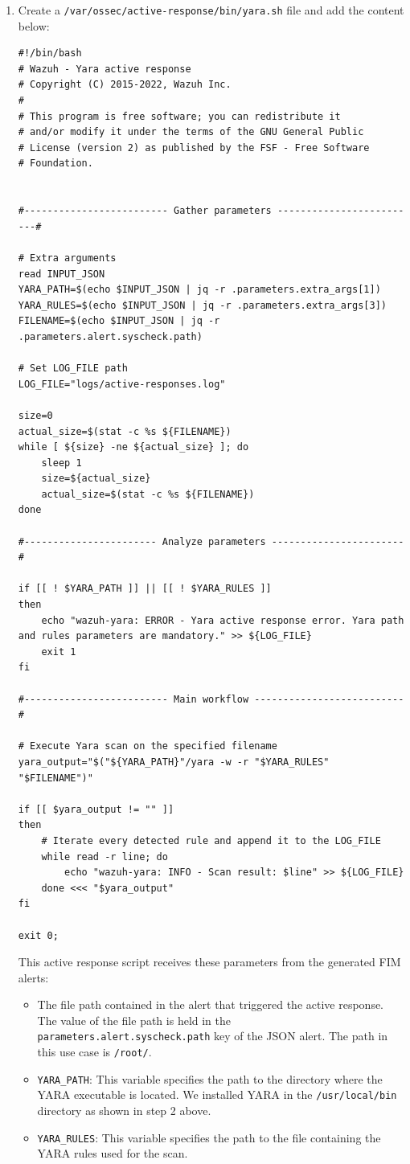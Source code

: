 \begin{enumerate}
    \item Create a \texttt{/var/ossec/active-response/bin/yara.sh} file and add the content below:
    \begin{verbatim}
#!/bin/bash
# Wazuh - Yara active response
# Copyright (C) 2015-2022, Wazuh Inc.
#
# This program is free software; you can redistribute it
# and/or modify it under the terms of the GNU General Public
# License (version 2) as published by the FSF - Free Software
# Foundation.


#------------------------- Gather parameters -------------------------#

# Extra arguments
read INPUT_JSON
YARA_PATH=$(echo $INPUT_JSON | jq -r .parameters.extra_args[1])
YARA_RULES=$(echo $INPUT_JSON | jq -r .parameters.extra_args[3])
FILENAME=$(echo $INPUT_JSON | jq -r .parameters.alert.syscheck.path)

# Set LOG_FILE path
LOG_FILE="logs/active-responses.log"

size=0
actual_size=$(stat -c %s ${FILENAME})
while [ ${size} -ne ${actual_size} ]; do
    sleep 1
    size=${actual_size}
    actual_size=$(stat -c %s ${FILENAME})
done

#----------------------- Analyze parameters -----------------------#

if [[ ! $YARA_PATH ]] || [[ ! $YARA_RULES ]]
then
    echo "wazuh-yara: ERROR - Yara active response error. Yara path and rules parameters are mandatory." >> ${LOG_FILE}
    exit 1
fi

#------------------------- Main workflow --------------------------#

# Execute Yara scan on the specified filename
yara_output="$("${YARA_PATH}"/yara -w -r "$YARA_RULES" "$FILENAME")"

if [[ $yara_output != "" ]]
then
    # Iterate every detected rule and append it to the LOG_FILE
    while read -r line; do
        echo "wazuh-yara: INFO - Scan result: $line" >> ${LOG_FILE}
    done <<< "$yara_output"
fi

exit 0;        
    \end{verbatim}

This active response script receives these parameters from the generated FIM alerts:
\begin{itemize}
    \item The file path contained in the alert that triggered the active response. The value of the file path is held in the \texttt{parameters.alert.syscheck.path} key of the JSON alert. The path in this use case is \texttt{/root/}.
    \item \texttt{YARA\_PATH}: This variable specifies the path to the directory where the YARA executable is located. We installed YARA in the \texttt{/usr/local/bin} directory as shown in step 2 above.
    \item \texttt{YARA\_RULES}: This variable specifies the path to the file containing the YARA rules used for the scan.
\end{itemize}


\end{enumerate}
